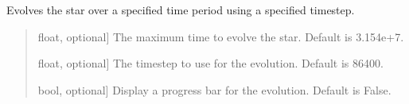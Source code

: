 \documentclass[letterpaper,10pt,english]{sphinxmanual}
\begin{document}
\begin{fulllineitems}
\begin{fulllineitems}
\begin{quote}
\begin{description}
\end{description}\end{quote}

\end{fulllineitems}


\begin{fulllineitems}
\label{\detokenize{CoolDwarf.star:CoolDwarf.star.sphere.VoxelSphere.evolve}}
\pysigstartsignatures
{}
\pysigstopsignatures
\sphinxAtStartPar
Evolves the star over a specified time period using a specified timestep.
\begin{quote}\begin{description}
\begin{description}
\sphinxlineitem{\sphinxstylestrong{maxTime}}{[}float, optional{]}
\sphinxAtStartPar
The maximum time to evolve the star. Default is 3.154e+7.

\sphinxlineitem{\sphinxstylestrong{dt}}{[}float, optional{]}
\sphinxAtStartPar
The timestep to use for the evolution. Default is 86400.

\sphinxlineitem{\sphinxstylestrong{pbar}}{[}bool, optional{]}
\sphinxAtStartPar
Display a progress bar for the evolution. Default is False.

\end{description}

\end{description}\end{quote}

\end{fulllineitems}



\end{fulllineitems}
\end{document}
